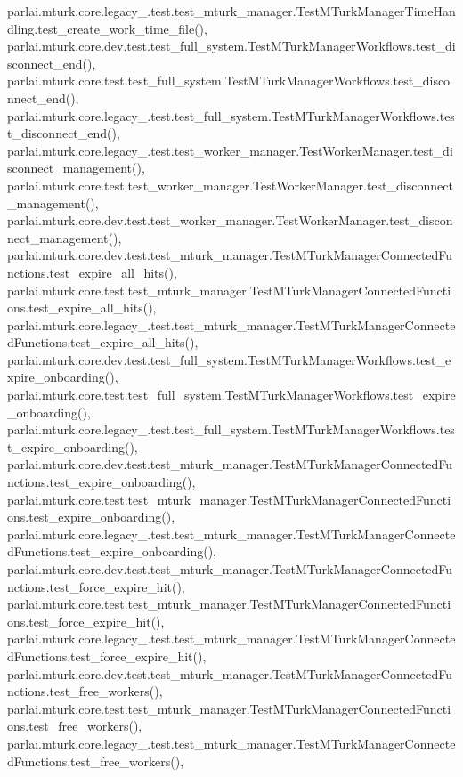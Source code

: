 parlai.\+mturk.\+core.\+legacy\+\_.\+test.\+test\+\_\+mturk\+\_\+manager.\+Test\+M\+Turk\+Manager\+Time\+Handling.\+test\+\_\+create\+\_\+work\+\_\+time\+\_\+file(), parlai.\+mturk.\+core.\+dev.\+test.\+test\+\_\+full\+\_\+system.\+Test\+M\+Turk\+Manager\+Workflows.\+test\+\_\+disconnect\+\_\+end(), parlai.\+mturk.\+core.\+test.\+test\+\_\+full\+\_\+system.\+Test\+M\+Turk\+Manager\+Workflows.\+test\+\_\+disconnect\+\_\+end(), parlai.\+mturk.\+core.\+legacy\+\_.\+test.\+test\+\_\+full\+\_\+system.\+Test\+M\+Turk\+Manager\+Workflows.\+test\+\_\+disconnect\+\_\+end(), parlai.\+mturk.\+core.\+legacy\+\_.\+test.\+test\+\_\+worker\+\_\+manager.\+Test\+Worker\+Manager.\+test\+\_\+disconnect\+\_\+management(), parlai.\+mturk.\+core.\+test.\+test\+\_\+worker\+\_\+manager.\+Test\+Worker\+Manager.\+test\+\_\+disconnect\+\_\+management(), parlai.\+mturk.\+core.\+dev.\+test.\+test\+\_\+worker\+\_\+manager.\+Test\+Worker\+Manager.\+test\+\_\+disconnect\+\_\+management(), parlai.\+mturk.\+core.\+dev.\+test.\+test\+\_\+mturk\+\_\+manager.\+Test\+M\+Turk\+Manager\+Connected\+Functions.\+test\+\_\+expire\+\_\+all\+\_\+hits(), parlai.\+mturk.\+core.\+test.\+test\+\_\+mturk\+\_\+manager.\+Test\+M\+Turk\+Manager\+Connected\+Functions.\+test\+\_\+expire\+\_\+all\+\_\+hits(), parlai.\+mturk.\+core.\+legacy\+\_.\+test.\+test\+\_\+mturk\+\_\+manager.\+Test\+M\+Turk\+Manager\+Connected\+Functions.\+test\+\_\+expire\+\_\+all\+\_\+hits(), parlai.\+mturk.\+core.\+dev.\+test.\+test\+\_\+full\+\_\+system.\+Test\+M\+Turk\+Manager\+Workflows.\+test\+\_\+expire\+\_\+onboarding(), parlai.\+mturk.\+core.\+test.\+test\+\_\+full\+\_\+system.\+Test\+M\+Turk\+Manager\+Workflows.\+test\+\_\+expire\+\_\+onboarding(), parlai.\+mturk.\+core.\+legacy\+\_.\+test.\+test\+\_\+full\+\_\+system.\+Test\+M\+Turk\+Manager\+Workflows.\+test\+\_\+expire\+\_\+onboarding(), parlai.\+mturk.\+core.\+dev.\+test.\+test\+\_\+mturk\+\_\+manager.\+Test\+M\+Turk\+Manager\+Connected\+Functions.\+test\+\_\+expire\+\_\+onboarding(), parlai.\+mturk.\+core.\+test.\+test\+\_\+mturk\+\_\+manager.\+Test\+M\+Turk\+Manager\+Connected\+Functions.\+test\+\_\+expire\+\_\+onboarding(), parlai.\+mturk.\+core.\+legacy\+\_.\+test.\+test\+\_\+mturk\+\_\+manager.\+Test\+M\+Turk\+Manager\+Connected\+Functions.\+test\+\_\+expire\+\_\+onboarding(), parlai.\+mturk.\+core.\+dev.\+test.\+test\+\_\+mturk\+\_\+manager.\+Test\+M\+Turk\+Manager\+Connected\+Functions.\+test\+\_\+force\+\_\+expire\+\_\+hit(), parlai.\+mturk.\+core.\+test.\+test\+\_\+mturk\+\_\+manager.\+Test\+M\+Turk\+Manager\+Connected\+Functions.\+test\+\_\+force\+\_\+expire\+\_\+hit(), parlai.\+mturk.\+core.\+legacy\+\_.\+test.\+test\+\_\+mturk\+\_\+manager.\+Test\+M\+Turk\+Manager\+Connected\+Functions.\+test\+\_\+force\+\_\+expire\+\_\+hit(), parlai.\+mturk.\+core.\+dev.\+test.\+test\+\_\+mturk\+\_\+manager.\+Test\+M\+Turk\+Manager\+Connected\+Functions.\+test\+\_\+free\+\_\+workers(), parlai.\+mturk.\+core.\+test.\+test\+\_\+mturk\+\_\+manager.\+Test\+M\+Turk\+Manager\+Connected\+Functions.\+test\+\_\+free\+\_\+workers(), parlai.\+mturk.\+core.\+legacy\+\_.\+test.\+test\+\_\+mturk\+\_\+manager.\+Test\+M\+Turk\+Manager\+Connected\+Functions.\+test\+\_\+free\+\_\+workers(), 